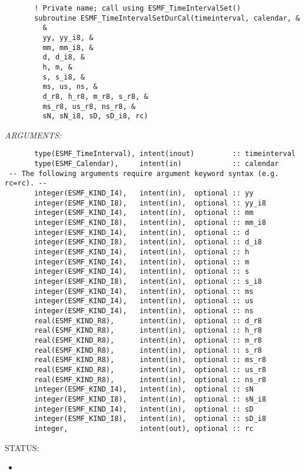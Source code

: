  
\begin{verbatim}       ! Private name; call using ESMF_TimeIntervalSet()
       subroutine ESMF_TimeIntervalSetDurCal(timeinterval, calendar, &
         &
         yy, yy_i8, &
         mm, mm_i8, &
         d, d_i8, &
         h, m, &
         s, s_i8, &
         ms, us, ns, &
         d_r8, h_r8, m_r8, s_r8, &
         ms_r8, us_r8, ns_r8, &
         sN, sN_i8, sD, sD_i8, rc)
 \end{verbatim}{\em ARGUMENTS:}
\begin{verbatim}       type(ESMF_TimeInterval), intent(inout)         :: timeinterval
       type(ESMF_Calendar),     intent(in)            :: calendar
 -- The following arguments require argument keyword syntax (e.g. rc=rc). --
       integer(ESMF_KIND_I4),   intent(in),  optional :: yy
       integer(ESMF_KIND_I8),   intent(in),  optional :: yy_i8
       integer(ESMF_KIND_I4),   intent(in),  optional :: mm
       integer(ESMF_KIND_I8),   intent(in),  optional :: mm_i8
       integer(ESMF_KIND_I4),   intent(in),  optional :: d
       integer(ESMF_KIND_I8),   intent(in),  optional :: d_i8
       integer(ESMF_KIND_I4),   intent(in),  optional :: h
       integer(ESMF_KIND_I4),   intent(in),  optional :: m
       integer(ESMF_KIND_I4),   intent(in),  optional :: s
       integer(ESMF_KIND_I8),   intent(in),  optional :: s_i8
       integer(ESMF_KIND_I4),   intent(in),  optional :: ms
       integer(ESMF_KIND_I4),   intent(in),  optional :: us
       integer(ESMF_KIND_I4),   intent(in),  optional :: ns
       real(ESMF_KIND_R8),      intent(in),  optional :: d_r8
       real(ESMF_KIND_R8),      intent(in),  optional :: h_r8
       real(ESMF_KIND_R8),      intent(in),  optional :: m_r8
       real(ESMF_KIND_R8),      intent(in),  optional :: s_r8
       real(ESMF_KIND_R8),      intent(in),  optional :: ms_r8
       real(ESMF_KIND_R8),      intent(in),  optional :: us_r8
       real(ESMF_KIND_R8),      intent(in),  optional :: ns_r8
       integer(ESMF_KIND_I4),   intent(in),  optional :: sN
       integer(ESMF_KIND_I8),   intent(in),  optional :: sN_i8
       integer(ESMF_KIND_I4),   intent(in),  optional :: sD
       integer(ESMF_KIND_I8),   intent(in),  optional :: sD_i8
       integer,                 intent(out), optional :: rc
 \end{verbatim}
{\sf STATUS:}
   \begin{itemize}
   \item{}
   \end{itemize}
  
